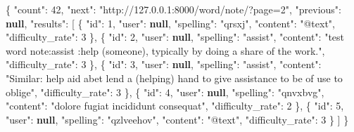 \documentclass[
]{article}
\newenvironment{Shaded}{}{}
\newcommand{\DataTypeTok}[1]{\textcolor[rgb]{0.56,0.13,0.00}{#1}}
\newcommand{\DecValTok}[1]{\textcolor[rgb]{0.25,0.63,0.44}{#1}}
\newcommand{\FunctionTok}[1]{\textcolor[rgb]{0.02,0.16,0.49}{#1}}
\newcommand{\KeywordTok}[1]{\textcolor[rgb]{0.00,0.44,0.13}{\textbf{#1}}}
\newcommand{\OtherTok}[1]{\textcolor[rgb]{0.00,0.44,0.13}{#1}}
\newcommand{\StringTok}[1]{\textcolor[rgb]{0.25,0.44,0.63}{#1}}
\begin{document}
\begin{Shaded}
\begin{Highlighting}[]
\FunctionTok{\{}
  \DataTypeTok{"count"}\FunctionTok{:} \DecValTok{42}\FunctionTok{,}
  \DataTypeTok{"next"}\FunctionTok{:} \StringTok{"http://127.0.0.1:8000/word/note/?page=2"}\FunctionTok{,}
  \DataTypeTok{"previous"}\FunctionTok{:} \KeywordTok{null}\FunctionTok{,}
  \DataTypeTok{"results"}\FunctionTok{:} \OtherTok{[}
    \FunctionTok{\{}
      \DataTypeTok{"id"}\FunctionTok{:} \DecValTok{1}\FunctionTok{,}
      \DataTypeTok{"user"}\FunctionTok{:} \KeywordTok{null}\FunctionTok{,}
      \DataTypeTok{"spelling"}\FunctionTok{:} \StringTok{"qrsxj"}\FunctionTok{,}
      \DataTypeTok{"content"}\FunctionTok{:} \StringTok{"@text"}\FunctionTok{,}
      \DataTypeTok{"difficulty\_rate"}\FunctionTok{:} \DecValTok{3}
    \FunctionTok{\}}\OtherTok{,}
    \FunctionTok{\{}
      \DataTypeTok{"id"}\FunctionTok{:} \DecValTok{2}\FunctionTok{,}
      \DataTypeTok{"user"}\FunctionTok{:} \KeywordTok{null}\FunctionTok{,}
      \DataTypeTok{"spelling"}\FunctionTok{:} \StringTok{"assist"}\FunctionTok{,}
      \DataTypeTok{"content"}\FunctionTok{:} \StringTok{"test word note:assist :help (someone), typically by doing a share of the work."}\FunctionTok{,}
      \DataTypeTok{"difficulty\_rate"}\FunctionTok{:} \DecValTok{3}
    \FunctionTok{\}}\OtherTok{,}
    \FunctionTok{\{}
      \DataTypeTok{"id"}\FunctionTok{:} \DecValTok{3}\FunctionTok{,}
      \DataTypeTok{"user"}\FunctionTok{:} \KeywordTok{null}\FunctionTok{,}
      \DataTypeTok{"spelling"}\FunctionTok{:} \StringTok{"assist"}\FunctionTok{,}
      \DataTypeTok{"content"}\FunctionTok{:} \StringTok{"Similar: help aid abet lend a (helping) hand to give assistance to be of use to oblige"}\FunctionTok{,}
      \DataTypeTok{"difficulty\_rate"}\FunctionTok{:} \DecValTok{3}
    \FunctionTok{\}}\OtherTok{,}
    \FunctionTok{\{}
      \DataTypeTok{"id"}\FunctionTok{:} \DecValTok{4}\FunctionTok{,}
      \DataTypeTok{"user"}\FunctionTok{:} \KeywordTok{null}\FunctionTok{,}
      \DataTypeTok{"spelling"}\FunctionTok{:} \StringTok{"qnvxbvg"}\FunctionTok{,}
      \DataTypeTok{"content"}\FunctionTok{:} \StringTok{"dolore fugiat incididunt consequat"}\FunctionTok{,}
      \DataTypeTok{"difficulty\_rate"}\FunctionTok{:} \DecValTok{2}
    \FunctionTok{\}}\OtherTok{,}
    \FunctionTok{\{}
      \DataTypeTok{"id"}\FunctionTok{:} \DecValTok{5}\FunctionTok{,}
      \DataTypeTok{"user"}\FunctionTok{:} \KeywordTok{null}\FunctionTok{,}
      \DataTypeTok{"spelling"}\FunctionTok{:} \StringTok{"qzlveehov"}\FunctionTok{,}
      \DataTypeTok{"content"}\FunctionTok{:} \StringTok{"@text"}\FunctionTok{,}
      \DataTypeTok{"difficulty\_rate"}\FunctionTok{:} \DecValTok{3}
    \FunctionTok{\}}
  \OtherTok{]}
\FunctionTok{\}}
\end{Highlighting}
\end{Shaded}
\end{document}
